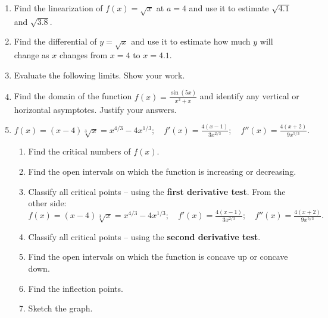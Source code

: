 \documentclass[11pt,fleqn]{article}
\newcommand{\be}{\begin{enumerate}}
\newcommand{\ee}{\end{enumerate}}
\renewcommand{\d}{\displaystyle}
\begin{document}
\begin{enumerate}
\item Find the linearization of $f(x)=\sqrt{x}$ at $a=4$ and use it to estimate $\sqrt{4.1}$ and $\sqrt{3.8}$.
\vfill
\item Find the differential of $y=\sqrt{x}$ and use it to estimate how much $y$ will change as $x$ changes from $x=4$ to $x=4.1.$
\vfill
\item Evaluate the following limits. Show your work. 
\be
{}
\vspace{2.5in}
\ee
\newpage
\item Find the domain of the function $f(x)=\frac{\sin(5x)}{x^2+x}$ and identify any vertical or horizontal asymptotes. Justify your answers.\\

\vspace{2.5in}

\item $f(x)=(x-4)\sqrt[3]{x}=x^{4/3}-4x^{1/3}; \quad f'(x)=\frac{4(x-1)}{3x^{2/3}}; \quad f''(x) = \frac{4(x+2)}{9x^{5/3}}.$
\be
  \item Find the critical numbers of $f(x).$
  \vfill
   \item Find the open intervals on which the function is increasing or
    decreasing. \vfill
    
    \item Classify all critical points -- using the \textbf{first derivative test}.  \vfill
    \newpage
    From the other side: $f(x)=(x-4)\sqrt[3]{x}=x^{4/3}-4x^{1/3}; \quad f'(x)=\frac{4(x-1)}{3x^{2/3}}; \quad f''(x) = \frac{4(x+2)}{9x^{5/3}}.$
    \item Classify all critical points -- using the \textbf{second derivative test}.  \vfill
    
    

  \item Find the open intervals on which the function is concave up or
    concave down.  \vfill
    
  \item Find the inflection points.   \vfill
  
  \item Sketch the graph.
  \vfill
\ee
\ee
\end{document}

